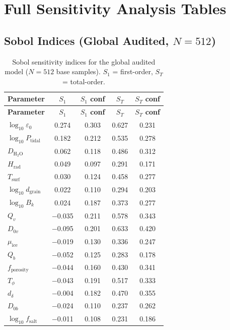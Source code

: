 \documentclass[11pt,letterpaper]{article}
\begin{document}
\section{Full Sensitivity Analysis Tables}
\label{app:sensitivity}

\subsection{Sobol Indices (Global Audited, $N = 512$)}

\begin{longtable}{@{}lcccc@{}}
\caption{Sobol sensitivity indices for the global audited model ($N = 512$ base samples). $S_1$ = first-order, $S_T$ = total-order.}
\label{tab:sobol_full} \\
\toprule
\textbf{Parameter} & \textbf{$S_1$} & \textbf{$S_1$ conf} & \textbf{$S_T$} & \textbf{$S_T$ conf} \\
\midrule
\endfirsthead
\toprule
\textbf{Parameter} & \textbf{$S_1$} & \textbf{$S_1$ conf} & \textbf{$S_T$} & \textbf{$S_T$ conf} \\
\midrule
\endhead
$\log_{10}\varepsilon_0$ & 0.274 & 0.303 & 0.627 & 0.231 \\
$\log_{10}P_\mathrm{tidal}$ & 0.182 & 0.212 & 0.535 & 0.278 \\
$D_\mathrm{H_2O}$ & 0.062 & 0.118 & 0.486 & 0.312 \\
$H_\mathrm{rad}$ & 0.049 & 0.097 & 0.291 & 0.171 \\
$T_\mathrm{surf}$ & 0.030 & 0.124 & 0.458 & 0.277 \\
$\log_{10}d_\mathrm{grain}$ & 0.022 & 0.110 & 0.294 & 0.203 \\
$\log_{10}B_k$ & 0.024 & 0.187 & 0.373 & 0.277 \\
$Q_v$ & $-$0.035 & 0.211 & 0.578 & 0.343 \\
$D_{0v}$ & $-$0.095 & 0.201 & 0.633 & 0.420 \\
$\mu_\mathrm{ice}$ & $-$0.019 & 0.130 & 0.336 & 0.247 \\
$Q_b$ & $-$0.052 & 0.125 & 0.283 & 0.178 \\
$f_\mathrm{porosity}$ & $-$0.044 & 0.160 & 0.430 & 0.341 \\
$T_\phi$ & $-$0.043 & 0.191 & 0.517 & 0.333 \\
$d_\delta$ & $-$0.004 & 0.182 & 0.470 & 0.355 \\
$D_{0b}$ & $-$0.024 & 0.110 & 0.237 & 0.262 \\
$\log_{10}f_\mathrm{salt}$ & $-$0.011 & 0.108 & 0.231 & 0.186 \\
\bottomrule
\end{longtable}
\end{document}
